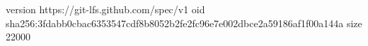 version https://git-lfs.github.com/spec/v1
oid sha256:3fdabb0cbac6353547cdf8b8052b2fe2fc96e7e002dbce2a59186af1f00a144a
size 22000
